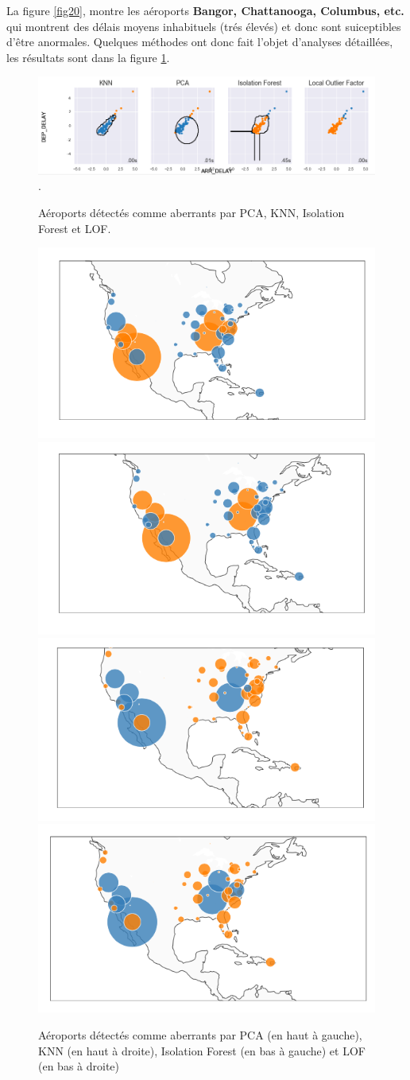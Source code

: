 \noindent La figure \ref{fig20}, montre les aéroports \textbf{Bangor, Chattanooga, Columbus, etc.} qui montrent des délais moyens inhabituels (trés élevés) et donc sont suiceptibles d'être anormales. Quelques méthodes ont donc fait l'objet d'analyses détaillées, les résultats sont dans la figure \ref{fig21}.\newl
\begin{figure}[ht]
    \centering
     \includegraphics[width=1\textwidth]{ADOA/Images/Voll.png}\label{fig02}.
    \caption{Aéroports détectés comme aberrants par PCA, KNN, Isolation Forest et LOF.}%
    \includegraphics[width=.45\textwidth]{ADOA/Images/vol1PCA.png}
    \includegraphics[width=.450\textwidth]{ADOA/Images/vols1KNN.png}\\
    \includegraphics[width=.45\textwidth]{ADOA/Images/volsIsoFor.png}
    \includegraphics[width=.450\textwidth]{ADOA/Images/volsLOFpng.png}
    \caption{Aéroports détectés comme aberrants par PCA (en haut à gauche), KNN (en haut à droite), Isolation Forest (en bas à gauche) et LOF (en bas à droite)}%
    \label{fig21}
\end{figure}


